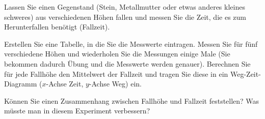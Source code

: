 \begin{aufgabe}
	Lassen Sie einen Gegenstand (Stein, Metallmutter oder etwas anderes kleines schweres) aus verschiedenen
	Höhen fallen und messen Sie die Zeit, die es zum Herunterfallen benötigt (Fallzeit).

	Erstellen Sie eine Tabelle, in die Sie die Messwerte eintragen.
	Messen Sie für fünf verschiedene Höhen und wiederholen Sie die Messungen einige Male 
	(Sie bekommen dadurch Übung und die Messwerte werden genauer).
	Berechnen Sie für jede Fallhöhe den Mittelwert der Fallzeit und tragen Sie diese in ein
	Weg-Zeit-Diagramm ($x$-Achse Zeit, $y$-Achse Weg) ein.

	Können Sie einen Zusammenhang zwischen Fallhöhe und Fallzeit feststellen?
	Was müsste man in diesem Experiment verbessern?
\end{aufgabe}

